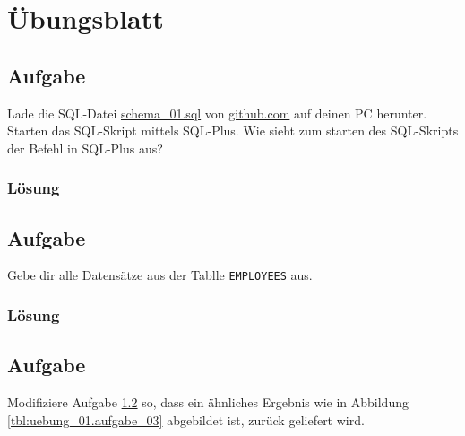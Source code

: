 \section{Übungsblatt}
\label{sec:uebung_01}

\subsection{Aufgabe}
\label{sec:uebung_01.aufgabe_01}
Lade die SQL-Datei \href{https://raw.githubusercontent.com/fh-trier/tgdb_ws1819/master/sql/schema_01.sql}{schema\_01.sql} von \href{https://raw.githubusercontent.com/fh-trier/tgdb_ws1819/master/sql/schema_01.sql}{github.com} auf deinen PC herunter. Starten das SQL-Skript mittels SQL-Plus. Wie sieht zum starten des SQL-Skripts der Befehl in SQL-Plus aus?

\subsubsection*{Lösung}
\label{sec:uebung_01.aufgabe_01.loesung}

\subsection{Aufgabe}
\label{sec:uebung_01.aufgabe_02}
Gebe dir alle Datensätze aus der Tablle \texttt{EMPLOYEES} aus.

\subsubsection*{Lösung}
\label{sec:uebung_01.aufgabe_02.loesung}

\subsection{Aufgabe}
\label{sec:uebung_01.aufgabe_03}
Modifiziere Aufgabe \ref{sec:uebung_01.aufgabe_02} so, dass ein ähnliches Ergebnis wie in Abbildung \ref{tbl:uebung_01.aufgabe_03} abgebildet ist, zurück geliefert wird.

